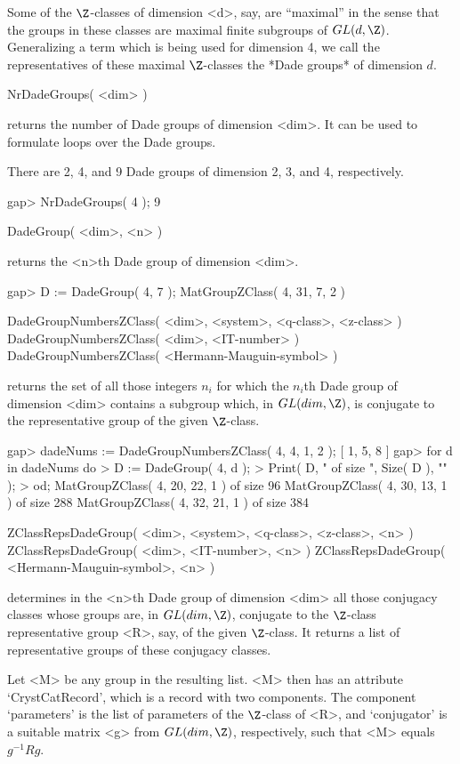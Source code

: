 
Some of the $\Z$-classes  of   dimension <d>, say, are ``maximal''  in
the sense  that the groups in these  classes are maximal finite subgroups
of $GL(d,\Z)$.  Generalizing a term which is  being used for dimension 4,
we call the representatives   of these  maximal $\Z$-classes  the *Dade
groups* of dimension $d$.

\>NrDadeGroups( <dim> )

returns the number of Dade groups of dimension <dim>. It can be used
to formulate loops over the Dade groups.

There are 2, 4, and 9 Dade groups of dimension 2, 3, and 4, respectively.

\beginexample
gap> NrDadeGroups( 4 );
9
\endexample

\>DadeGroup( <dim>, <n> )

returns the <n>th Dade group of dimension <dim>.

\beginexample
gap> D := DadeGroup( 4, 7 );
MatGroupZClass( 4, 31, 7, 2 )
\endexample

\>DadeGroupNumbersZClass( <dim>, <system>, <q-class>, <z-class> )
\>DadeGroupNumbersZClass( <dim>, <IT-number> )
\>DadeGroupNumbersZClass( <Hermann-Mauguin-symbol> )

returns the set of all those integers $n_i$ for which the $n_i$th Dade
group of dimension <dim> contains a subgroup which, in $GL(dim,\Z)$,
is conjugate to the representative group of the given $\Z$-class.

\beginexample
gap> dadeNums := DadeGroupNumbersZClass( 4, 4, 1, 2 );
[ 1, 5, 8 ]
gap> for d in dadeNums do
>     D := DadeGroup( 4, d );
>     Print( D, " of size ", Size( D ), "\n" );
> od;
MatGroupZClass( 4, 20, 22, 1 ) of size 96
MatGroupZClass( 4, 30, 13, 1 ) of size 288
MatGroupZClass( 4, 32, 21, 1 ) of size 384
\endexample

\>ZClassRepsDadeGroup( <dim>, <system>, <q-class>, <z-class>, <n> )
\>ZClassRepsDadeGroup( <dim>, <IT-number>, <n> )
\>ZClassRepsDadeGroup( <Hermann-Mauguin-symbol>, <n> )

determines in the <n>th Dade group of dimension <dim> all those
conjugacy classes whose groups are, in $GL(dim,\Z)$, conjugate to the
$\Z$-class representative group <R>, say, of the given $\Z$-class.  It
returns a list of representative groups of these conjugacy classes.

Let <M> be any group in the resulting list.  <M> then has an attribute
`CrystCatRecord', which is a record with two components. The
component `parameters' is the list of parameters of the $\Z$-class of
<R>, and `conjugator' is a suitable matrix <g> from $GL(dim,\Z)$,
respectively, such that <M> equals $g^{-1} R g$.

